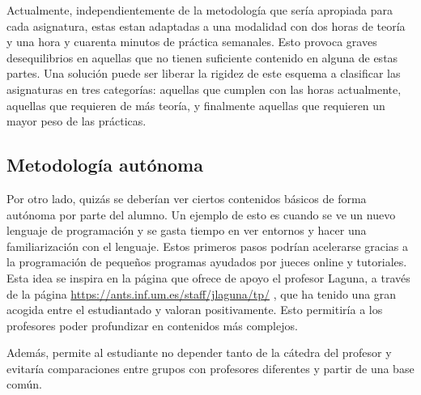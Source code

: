 Actualmente, independientemente de la metodología que sería apropiada para 
cada asignatura, estas estan adaptadas a una modalidad con dos horas de
teoría y una hora y cuarenta minutos de práctica semanales. Esto provoca
graves desequilibrios en aquellas que no tienen suficiente contenido en
alguna de estas partes. Una solución puede ser liberar la rigidez de este 
esquema a clasificar las asignaturas en tres categorías: aquellas que 
cumplen con las horas actualmente, aquellas que requieren de más teoría,
y finalmente aquellas que requieren un mayor peso de las prácticas. 

\subsection{Metodología autónoma}

Por otro lado, quizás se deberían ver ciertos contenidos básicos de forma
autónoma por parte del alumno. Un ejemplo de esto es cuando se ve un nuevo
lenguaje de programación y se gasta tiempo en ver entornos y hacer una 
familiarización con el lenguaje. Estos primeros pasos podrían acelerarse
gracias a la programación de pequeños programas ayudados por jueces online y
tutoriales. Esta idea se inspira en la página que ofrece de apoyo el profesor 
Laguna, a través de la página \url{https://ants.inf.um.es/staff/jlaguna/tp/}
, que ha tenido una gran acogida entre el estudiantado y valoran positivamente.
Esto permitiría a los profesores poder profundizar en contenidos más complejos.

Además, permite al estudiante no depender tanto de la cátedra del profesor y 
evitaría comparaciones entre grupos con profesores diferentes y partir de 
una base común.
